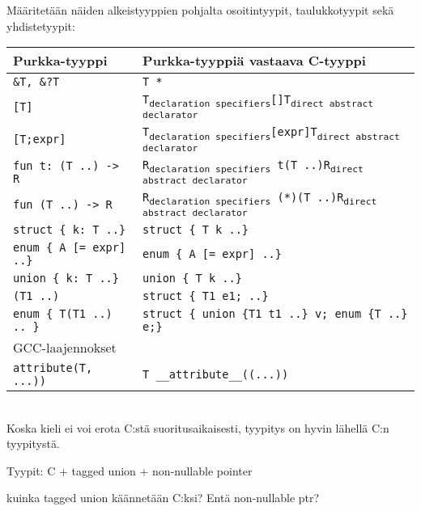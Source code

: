 Määritetään näiden alkeistyyppien pohjalta osoitintyypit, taulukkotyypit sekä
yhdistetyypit: \\[0.3cm]
\begin{tabular}{@{}ll@{}} \toprule
    Purkka-tyyppi & Purkka-tyyppiä vastaava C-tyyppi \\ \midrule
    \texttt{\&T, \&?T} & \texttt{T *} \\
    [0.2cm]

    \texttt{[T]} & \texttt{T\textsubscript{declaration specifiers}[]T\textsubscript{direct abstract declarator}} \\
    \texttt{[T;expr]} & \texttt{T\textsubscript{declaration specifiers}[expr]T\textsubscript{direct abstract declarator}} \\
    [0.2cm]

    \texttt{fun t: (T ..) -> R} & \texttt{R\textsubscript{declaration specifiers}~t(T ..)R\textsubscript{direct abstract declarator}} \\
    \texttt{fun (T ..) -> R} & \texttt{R\textsubscript{declaration specifiers}~(*)(T ..)R\textsubscript{direct abstract declarator}} \\
    [0.2cm]

    \texttt{struct \{ k: T ..\}} & \texttt{struct \{ T k ..\}} \\
    \texttt{enum \{ A [= expr] ..\}} & \texttt{enum \{ A [= expr] ..\}} \\
    \texttt{union \{ k: T ..\}} & \texttt{union \{ T k ..\}} \\
    [0.2cm]

    \texttt{(T1 ..)} & \texttt{struct \{ T1 e1; ..\}} \\
    \texttt{enum \{ T(T1 ..) .. \}} & \texttt{struct \{ union \{T1 t1 ..\} v; enum \{T ..\} e;\}} \\
    [0.2cm]

    GCC-laajennokset & \\
    \texttt{attribute(T, ...))} & \texttt{T \_\_attribute\_\_((...))} \\

    \bottomrule
\end{tabular} \\

Koska kieli ei voi erota C:stä suoritusaikaisesti, tyypitys on hyvin lähellä
C:n tyypitystä.

Tyypit:
 C + tagged union + non-nullable pointer

kuinka tagged union käännetään C:ksi? Entä non-nullable ptr?

